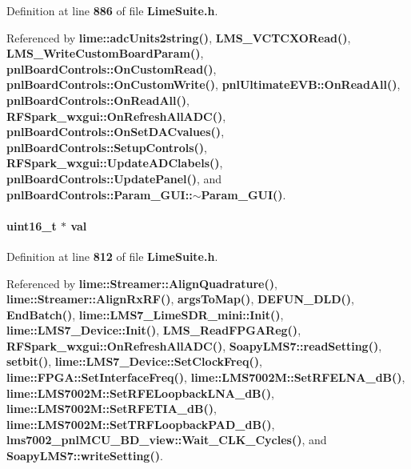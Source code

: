 Definition at line {\bf 886} of file {\bf Lime\+Suite.\+h}.



Referenced by {\bf lime\+::adc\+Units2string()}, {\bf L\+M\+S\+\_\+\+V\+C\+T\+C\+X\+O\+Read()}, {\bf L\+M\+S\+\_\+\+Write\+Custom\+Board\+Param()}, {\bf pnl\+Board\+Controls\+::\+On\+Custom\+Read()}, {\bf pnl\+Board\+Controls\+::\+On\+Custom\+Write()}, {\bf pnl\+Ultimate\+E\+V\+B\+::\+On\+Read\+All()}, {\bf pnl\+Board\+Controls\+::\+On\+Read\+All()}, {\bf R\+F\+Spark\+\_\+wxgui\+::\+On\+Refresh\+All\+A\+D\+C()}, {\bf pnl\+Board\+Controls\+::\+On\+Set\+D\+A\+Cvalues()}, {\bf pnl\+Board\+Controls\+::\+Setup\+Controls()}, {\bf R\+F\+Spark\+\_\+wxgui\+::\+Update\+A\+D\+Clabels()}, {\bf pnl\+Board\+Controls\+::\+Update\+Panel()}, and {\bf pnl\+Board\+Controls\+::\+Param\+\_\+\+G\+U\+I\+::$\sim$\+Param\+\_\+\+G\+U\+I()}.

\paragraph[{val}]{\setlength{\rightskip}{0pt plus 5cm}uint16\+\_\+t $\ast$ val}\label{group__FN__LOW__LVL_gaa4f209c056c387c044201ffd5e668ffa}


Definition at line {\bf 812} of file {\bf Lime\+Suite.\+h}.



Referenced by {\bf lime\+::\+Streamer\+::\+Align\+Quadrature()}, {\bf lime\+::\+Streamer\+::\+Align\+Rx\+R\+F()}, {\bf args\+To\+Map()}, {\bf D\+E\+F\+U\+N\+\_\+\+D\+L\+D()}, {\bf End\+Batch()}, {\bf lime\+::\+L\+M\+S7\+\_\+\+Lime\+S\+D\+R\+\_\+mini\+::\+Init()}, {\bf lime\+::\+L\+M\+S7\+\_\+\+Device\+::\+Init()}, {\bf L\+M\+S\+\_\+\+Read\+F\+P\+G\+A\+Reg()}, {\bf R\+F\+Spark\+\_\+wxgui\+::\+On\+Refresh\+All\+A\+D\+C()}, {\bf Soapy\+L\+M\+S7\+::read\+Setting()}, {\bf setbit()}, {\bf lime\+::\+L\+M\+S7\+\_\+\+Device\+::\+Set\+Clock\+Freq()}, {\bf lime\+::\+F\+P\+G\+A\+::\+Set\+Interface\+Freq()}, {\bf lime\+::\+L\+M\+S7002\+M\+::\+Set\+R\+F\+E\+L\+N\+A\+\_\+d\+B()}, {\bf lime\+::\+L\+M\+S7002\+M\+::\+Set\+R\+F\+E\+Loopback\+L\+N\+A\+\_\+d\+B()}, {\bf lime\+::\+L\+M\+S7002\+M\+::\+Set\+R\+F\+E\+T\+I\+A\+\_\+d\+B()}, {\bf lime\+::\+L\+M\+S7002\+M\+::\+Set\+T\+R\+F\+Loopback\+P\+A\+D\+\_\+d\+B()}, {\bf lms7002\+\_\+pnl\+M\+C\+U\+\_\+\+B\+D\+\_\+view\+::\+Wait\+\_\+\+C\+L\+K\+\_\+\+Cycles()}, and {\bf Soapy\+L\+M\+S7\+::write\+Setting()}.

